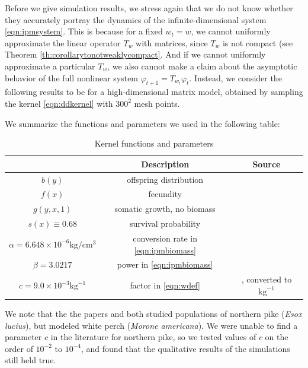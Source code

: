 Before we give simulation results, we stress again that we do not know whether they accurately portray the dynamics of the infinite-dimensional system \ref{eqn:ipmsystem}. This is because for a fixed $w_t = w$, we cannot uniformly approximate the linear operator $T_w$ with matrices, since $T_w$ is not compact (see Theorem \ref{th:corollarytonotweaklycompact}. And if we cannot uniformly approximate a particular $T_{w}$, we also cannot make a claim about the asymptotic behavior of the full nonlinear system $\varphi_{t+1} = T_{w_t} \varphi_t$. Instead, we consider the following results to be for a high-dimensional matrix model, obtained by sampling the kernel \eqref{eqn:ddkernel} with $300^2$ mesh points. 

We summarize the functions and parameters we used in the following table:

\begin{table}[h!]
	\begin{center}
		\caption{Kernel functions and parameters}
		\label{tab:funcsandparams}
		\begin{tabular}{c|c|c}
			\hline
			 & \textbf{Description} & \textbf{Source}\\
			\hline \hline
			$b(y)$ & offspring distribution & \cite{Vindenes2014} \\
			$f(x)$ & fecundity & \cite{Vindenes2014} \\
			$g(y, x, 1)$ & somatic growth, no biomass & \cite{Vindenes2014} \\
			$s(x) \equiv 0.68$ & survival probability & \cite{Vindenes2014} \\
			$\alpha = 6.648 \times 10^{-6} \text{kg}/\text{cm}^3$ & conversion rate in \eqref{eqn:ipmbiomass} & \cite{Milardi2014} \\
			$\beta = 3.0217$ & power in \eqref{eqn:ipmbiomass} & \cite{Milardi2014} \\
			$c = 9.0 \times 10^{-3} \text{kg}^{-1}$ & factor in \eqref{eqn:wdef} & \cite{Chizinski2010}, converted to $\text{kg}^{-1}$ \\
			\hline
		\end{tabular}
	\end{center}
\end{table}

We note that the the papers \cite{Vindenes2014} and \cite{Milardi2014} both studied populations of northern pike (\emph{Esox lucius}), but \cite{Chizinski2010} modeled white perch (\emph{Morone americana}). We were unable to find a parameter $c$ in the literature for northern pike, so we tested values of $c$ on the order of $10^{-2}$ to $10^{-4}$, and found that the qualitative results of the simulations still held true.

